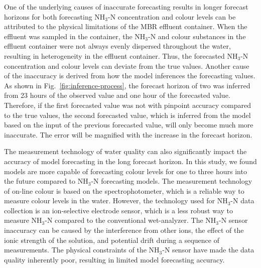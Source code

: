 One of the underlying causes of inaccurate forecasting results in longer forecast horizons for both forecasting NH$_{3}$-N concentration and colour levels can be attributed to the physical limitations of the MBR effluent container. When the effluent was sampled in the container, the NH$_{3}$-N and colour substances in the effluent container were not always evenly dispersed throughout the water, resulting in heterogeneity in the effluent container. Thus, the forecasted NH$_{3}$-N concentration and colour levels can deviate from the true values. Another cause of the inaccuracy is derived from how the model inferences the forecasting values. As shown in Fig.~\ref{fig:inference-process}, the forecast horizon of two was inferred from 23 hours of the observed value and one hour of the forecasted value. Therefore, if the first forecasted value was not with pinpoint accuracy compared to the true values, the second forecasted value, which is inferred from the model based on the input of the previous forecasted value, will only become much more inaccurate. The error will be magnified with the increase in the forecast horizon.

The measurement technology of water quality can also significantly impact the accuracy of model forecasting in the long forecast horizon. In this study, we found models are more capable of forecasting colour levels for one to three hours into the future compared to NH$_{3}$-N forecasting models. The measurement technology of on-line colour is based on the spectrophotometer, which is a reliable way to measure colour levels in the water. However, the technology used for NH$_{3}$-N data collection is an ion-selective electrode sensor, which is a less robust way to measure NH$_{3}$-N compared to the conventional wet-analyzer. The NH$_{3}$-N sensor inaccuracy can be caused by the interference from other ions, the effect of the ionic strength of the solution, and potential drift during a sequence of measurements. The physical constraints of the NH$_{3}$-N sensor have made the data quality inherently poor, resulting in limited model forecasting accuracy.